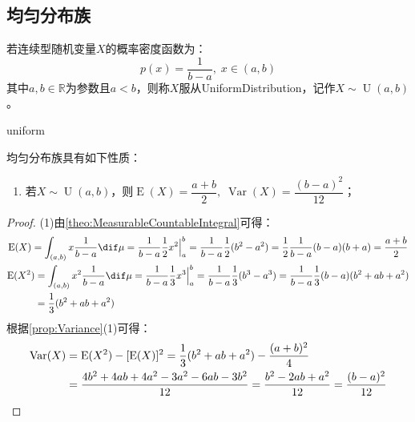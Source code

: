\subsection{均匀分布族}
\begin{definition}
	若连续型随机变量$X$的概率密度函数为：
	\begin{equation*}
		p(x)=\frac{1}{b-a},\;x\in(a,b)
	\end{equation*}
	其中$a,b\in\mathbb{R}$为参数且$a<b$，则称$X$服从\gls{UniformDistribution}，记作$X\sim\operatorname{U}(a,b)$。
\end{definition}
\begin{densityplot}{uniform}
	\caption{均匀分布 $\operatorname{U}(0,1)$ 的概率密度函数}
\end{densityplot}
\begin{property}
	均匀分布族具有如下性质：
	\begin{enumerate}
		\item 若$X\sim\operatorname{U}(a,b)$，则$\operatorname{E}(X)=\dfrac{a+b}{2},\;\operatorname{Var}(X)=\dfrac{(b-a)^2}{12}$；
	\end{enumerate}
\end{property}
\begin{proof}
	(1)由\cref{theo:MeasurableCountableIntegral}可得：
	\begin{gather*}
		\operatorname{E}(X)=\int_{(a,b)}x\frac{1}{b-a}\dif\mu=\frac{1}{b-a}\frac{1}{2}x^2\Big|_a^b=\frac{1}{b-a}\frac{1}{2}(b^2-a^2)=\frac{1}{2}\frac{1}{b-a}(b-a)(b+a)=\frac{a+b}{2} \\
		\begin{aligned}
			\operatorname{E}(X^2)&=\int_{(a,b)}x^2\frac{1}{b-a}\dif\mu=\frac{1}{b-a}\frac{1}{3}x^3\Big|_a^b=\frac{1}{b-a}\frac{1}{3}(b^3-a^3)=\frac{1}{b-a}\frac{1}{3}(b-a)(b^2+ab+a^2) \\
			&=\frac{1}{3}(b^2+ab+a^2)
		\end{aligned}
	\end{gather*}
	根据\cref{prop:Variance}(1)可得：
	\begin{align*}
		\operatorname{Var}(X)&=\operatorname{E}(X^2)-[\operatorname{E}(X)]^2=\frac{1}{3}(b^2+ab+a^2)-\frac{(a+b)^2}{4} \\
		&=\frac{4b^2+4ab+4a^2-3a^2-6ab-3b^2}{12}=\frac{b^2-2ab+a^2}{12}=\frac{(b-a)^2}{12}\qedhere
	\end{align*}
\end{proof}

